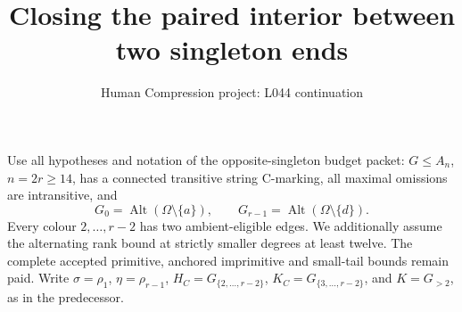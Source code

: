 \documentclass[11pt,a4paper]{article}
\title{Closing the paired interior between two singleton ends}
\author{Human Compression project: L044 continuation}
\date{}
\begin{document}
\maketitle
Use all hypotheses and notation of the opposite-singleton budget
packet: $G\le A_n$, $n=2r\ge14$, has a connected transitive string
C-marking, all maximal omissions are intransitive, and
\[
 G_0=\operatorname{Alt}(\Omega\setminus\{a\}),\qquad
 G_{r-1}=\operatorname{Alt}(\Omega\setminus\{d\}).
\]
Every colour $2,\ldots,r-2$ has two ambient-eligible edges.
We additionally assume the alternating rank bound at strictly smaller
degrees at least twelve. The complete accepted primitive, anchored
imprimitive and small-tail bounds remain paid.
Write $\sigma=\rho_1$, $\eta=\rho_{r-1}$,
$H_C=G_{\{2,\ldots,r-2\}}$, $K_C=G_{\{3,\ldots,r-2\}}$,
and $K=G_{>2}$, as in the predecessor.
\end{document}
